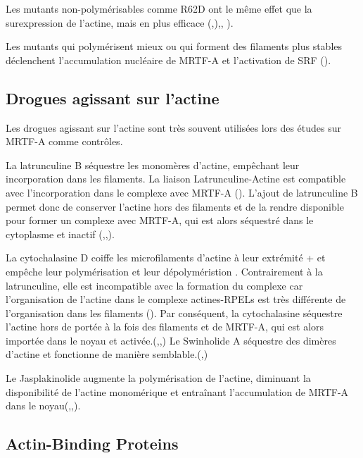 \documentclass{report}
\begin{document}
Les mutants non-polymérisables comme R62D ont le même effet que la surexpression de l'actine, mais en plus efficace (\cite{posern_mutant_2002},\cite{miralles_actin_2003}),\cite{vartiainen_nuclear_2007}, \cite{collard_nuclear_2014}). 

Les mutants qui polymérisent mieux ou qui forment des filaments plus stables déclenchent l'accumulation nucléaire de MRTF-A et l'activation de SRF (\cite{posern_mutant_2004}). 


\subsection{Drogues agissant sur l'actine}

Les drogues agissant sur l'actine sont très souvent utilisées lors des études sur MRTF-A comme contrôles. 

La latrunculine B séquestre les monomères d'actine, empêchant leur incorporation dans les filaments. La liaison Latrunculine-Actine est compatible avec l'incorporation dans le complexe avec MRTF-A (\cite{mouilleron_molecular_2008}). 
L'ajout de latrunculine B permet donc de conserver l'actine hors des filaments et de la rendre disponible pour former un complexe avec MRTF-A, qui est alors séquestré dans le cytoplasme et inactif (\cite{vartiainen_nuclear_2007},\cite{zhao_force_2007},\cite{smith_induction_2013}). 

La cytochalasine D coiffe les microfilaments d'actine à leur extrémité + et empêche leur polymérisation et leur dépolyméristion . 
Contrairement à la latrunculine, elle est incompatible avec la formation du complexe car l'organisation de l'actine dans le complexe actines-RPELs est très différente de l'organisation dans les filaments (\cite{treisman_structure_2011}). 
Par conséquent, la cytochalasine séquestre l'actine hors de portée à la fois des filaments et de MRTF-A, qui est alors importée dans le noyau et activée.(\cite{miralles_actin_2003},\cite{vartiainen_nuclear_2007},\cite{smith_induction_2013}) Le Swinholide A séquestre des dimères d'actine et fonctionne de manière semblable.(\cite{miralles_actin_2003},\cite{vartiainen_nuclear_2007})

Le Jasplakinolide augmente la polymérisation de l'actine, diminuant la disponibilité de l'actine monomérique et entraînant l'accumulation de MRTF-A dans le noyau(\cite{miralles_actin_2003},\cite{vartiainen_nuclear_2007},\cite{smith_induction_2013}). 


\subsection{Actin-Binding Proteins}
\end{document}
